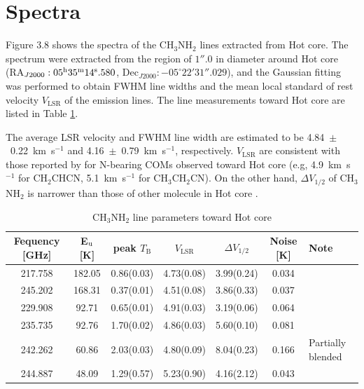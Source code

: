 \section{Spectra}
Figure 3.8 shows the spectra of the CH$_3$NH$_2$ lines extracted from Hot core.
The spectrum were extracted from the region of $1''.0$ in diameter around 
Hot core (RA$_{J2000}: 05^{\rm{h}}35^{\rm{m}}14^{\rm{s}}.580$, Dec$_{J2000}:-05^{\circ}22'31''.029$), 
and the Gaussian fitting was performed to obtain FWHM line widths and the mean local standard of 
rest velocity $V_{\mathrm{LSR}}$ of the emission lines.
The line measurements toward Hot core are listed in Table \ref{tab:paraOri}.


The average LSR velocity and FWHM line width are estimated to be 4.84~$\pm$~0.22~km~s$^{-1}$ and 
4.16~$\pm$~0.79~km~s$^{-1}$, respectively.
 $V_{\mathrm{LSR}}$ are consistent with those reported by \citet{Feng+2015} 
 for N-bearing COMs observed toward Hot core
 (e.g, 4.9~km~s$^{-1}$ for CH$_2$CHCN, 5.1~km~s$^{-1}$ for CH$_3$CH$_2$CN).
On the other hand, $\Delta V_{1/2}$ of CH$_3$NH$_2$ is narrower than those of other molecule in Hot core
\citep[typically 5--15~km~s$^{-1}$,][]{Pagani+2017}.

\renewcommand{\arraystretch}{1.5}
\begin{table}[htb]
\begin{center}

  \caption{CH$_3$NH$_2$ line parameters toward Hot core}
  \label{tab:paraOri}
{\scriptsize
  \begin{tabular}{ccccccl} \hline
   Fequency [GHz]& E$_{\rm{u}}$ [K] &  peak $T_{\mathrm{B}}$\footnotemark[1] [K] & $V_{\mathrm{LSR}}$\footnotemark[1] [km s$^{-1}$] & $\Delta V_{1/2}$\footnotemark[1] [km s$^{-1}$] & Noise [K]  & Note \\ \hline 
    217.758  & 182.05 &  0.86(0.03) & 4.73(0.08) & 3.99(0.24) & 0.034 & \\
    245.202 & 168.31 & 0.37(0.01) & 4.51(0.08) & 3.86(0.33) & 0.037 & \\
    229.908  & 92.71 &  0.65(0.01) & 4.91(0.03) & 3.19(0.06)& 0.064&\\ 
    235.735  & 92.76 & 1.70(0.02) & 4.86(0.03) & 5.60(0.10)& 0.081 & \\
    242.262  & 60.86 &  2.03(0.03) & 4.80(0.09) & 8.04(0.23) & 0.166 & Partially blended \\
    244.887  & 48.09 & 1.29(0.57)& 5.23(0.90) & 4.16(2.12) & 0.043 & \\ \hline
  \end{tabular}
  }
\end{center}
\end{table}

